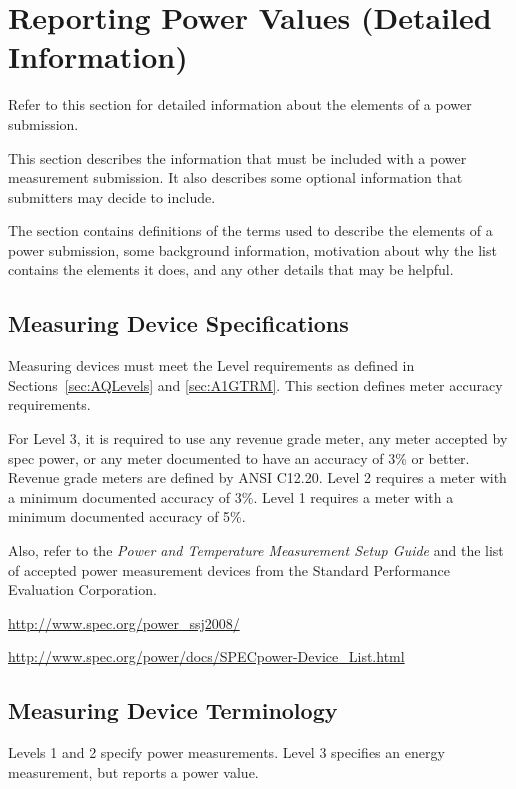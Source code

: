 \chapter{Reporting Power Values \normalsize{(Detailed Information)}}
\label{sec:reporting}

\noindent
Refer to this section for detailed information about the elements of a power submission. 
\wl

\noindent
This section describes the information that must be included with a power measurement submission. It also describes some optional information that submitters may decide to include.
\wl

\noindent
The section contains definitions of the terms used to describe the elements of a power submission, some background information, motivation about why the list contains the elements it does, and any other details that may be helpful.
\noindent


\section{Measuring Device Specifications}
\label{sec:MDSpecs}
\noindent
Measuring devices must meet the Level requirements as defined in 
Sections~\ref{sec:AQLevels} and \ref{sec:A1GTRM}. This section defines meter accuracy requirements.
\wl

\noindent
For Level 3, it is required to use any revenue grade meter, any meter accepted by spec power, or any meter documented to have an accuracy of 3\% or better. 
Revenue grade meters are defined by ANSI C12.20.  
Level 2 requires a meter with a minimum documented accuracy of 3\%.
Level 1 requires a meter with a minimum documented accuracy of 5\%.
\wl

\noindent
Also, refer to 
the {\itshape Power and Temperature Measurement Setup Guide \/} and the list of accepted power measurement devices from the Standard Performance Evaluation Corporation.
\wl

\noindent
\url{http://www.spec.org/power_ssj2008/}

\noindent
\url{http://www.spec.org/power/docs/SPECpower-Device_List.html }

\section{Measuring Device Terminology}
\label{sec:MDTerm}
\noindent
Levels 1 and 2 specify power measurements. Level 3 specifies an energy measurement, but reports a power value.

